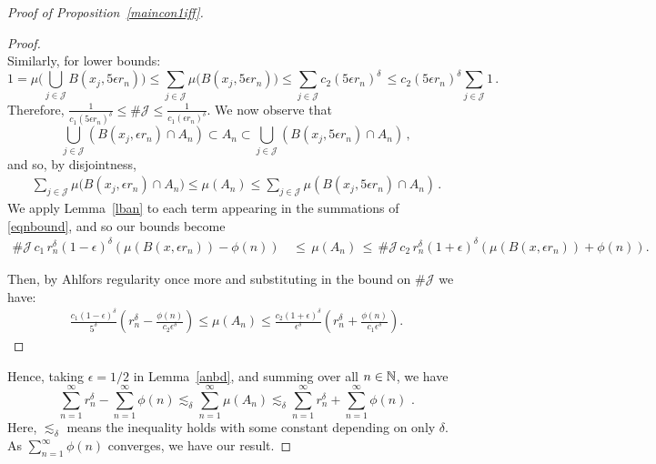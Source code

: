 \documentclass[11pt,reqno]{amsart}
\newcommand{\N}{{\Bbb N}}
\newcommand{\0}{\mathbf{0}}
\theoremstyle{remark}
\numberwithin{equation}{section}
\theoremstyle{remark}
\numberwithin{equation}{section}
\begin{document}
\begin{proof}[Proof of Proposition~\ref{maincon1iff}]
\begin{proof}
$$$$ 
Similarly, for lower bounds: 
$$
1=\mu\Big( \bigcup_{j \in \mathcal{J}}B(x_j,5\epsilon r_n)\Big) \leq \sum_{j \in \mathcal{J}} \mu\big(B(x_j, 5\epsilon r_n)\big) \leq 
\sum_{j \in \mathcal{J}}c_2 (5\epsilon r_n)^\delta \, \leq c_2(5\epsilon r_n)^\delta \sum_{j \in \mathcal{J}}1  \, .
$$
Therefore, $\frac{1}{c_1(5\epsilon r_n)^\delta}\leq \#\mathcal{J}\leq\frac{1}{c_1(\epsilon r_n)^\delta}$. We now observe that
$$
\bigcup_{j \in \mathcal{J}}(B(x_j,\epsilon r_n) \cap A_n) \subset A_n \subset \bigcup_{j \in \mathcal{J}}(B(x_j,5\epsilon r_n) \cap A_n) \, ,
$$
and so, by disjointness,
\begin{eqnarray}\label{eqnbound}
     \sum\limits_{j \in \mathcal{J}}\mu \big(B(x_j,\epsilon r_n) \cap A_n\big) \leq \mu(A_n) \leq \sum\limits_{j \in \mathcal{J}} \mu (B(x_j,5\epsilon r_n) \cap A_n)\, .
\end{eqnarray}
 We apply Lemma~\ref{lban} to each term appearing in the summations of \eqref{eqnbound}, and so our bounds become
\begin{align*}
\#\mathcal{J}\,c_1\,r_n^\delta(1-\epsilon )^\delta
   \left(\mu(B(x,\epsilon r_n)) - \phi(n)\right)
   &\,\leq\, \mu(A_n) \, \leq \,
   \#\mathcal{J}\,c_2\,r_n^\delta(1+\epsilon )^\delta
   \left(\mu(B(x,\epsilon r_n)) + \phi(n)\right).
\end{align*}

Then, by Ahlfors regularity once more and substituting in the bound on $\# \mathcal{J}$ we have:
 \begin{align*}
   \frac{c_1(1-\epsilon )^\delta}{5^\delta} \left( r_n^\delta - \frac{\phi(n)}{c_2 \epsilon^\delta}\right)
    \leq   \mu(A_n)  \leq  \frac{ c_2(1+\epsilon )^\delta}{ \epsilon^\delta}\left(  r_n^\delta+\frac{\phi(n)}{c_1 \epsilon^\delta} \right).
\end{align*}
\end{proof}
    Hence, taking $\epsilon=1/2$ in Lemma~\ref{anbd}, and summing over all $n \in \N$,  we have $$\sum\limits_{n=1}^\infty r_n^\delta  - \sum\limits_{n=1}^\infty \phi(n) \lesssim_{\delta} \sum\limits_{n=1}^\infty \mu(A_n) \lesssim_{\delta} \sum\limits_{n=1}^\infty r_n^\delta  + \sum\limits_{n=1}^\infty \phi(n) \, \, .$$ 
    Here, $\lesssim_{\delta}$ means the inequality holds with some constant depending on only $\delta$.
    As $ \sum\limits_{n=1}^\infty \phi(n)$ converges, we have our result.
\end{proof}
\end{document}
